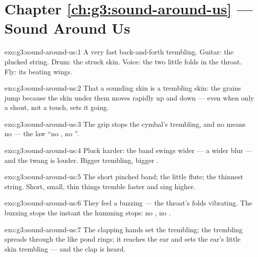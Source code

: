 \section*{Chapter \ref{ch:g3:sound-around-us} --- Sound Around Us}

\begin{solution}{exo:g3:sound-around-us:1}
A very fast back-and-forth trembling. Guitar: the plucked string.
Drum: the struck skin. Voice: the two little folds in the throat.
Fly: its beating wings.
\end{solution}

\begin{solution}{exo:g3:sound-around-us:2}
That a sounding skin is a trembling skin: the grains jump because
the skin under them moves rapidly up and down --- even when only a
shout, not a touch, sets it going.
\end{solution}

\begin{solution}{exo:g3:sound-around-us:3}
The grip stops the cymbal's trembling, and no  means no
 --- the law ``no , no ''.
\end{solution}

\begin{solution}{exo:g3:sound-around-us:4}
Pluck harder: the band swings wider --- a wider blur --- and the
twang is louder. Bigger trembling, bigger .
\end{solution}

\begin{solution}{exo:g3:sound-around-us:5}
The short pinched band; the little flute; the thinnest string.
Short, small, thin things tremble faster and sing higher.
\end{solution}

\begin{solution}{exo:g3:sound-around-us:6}
They feel a buzzing --- the throat's folds vibrating. The buzzing
stops the instant the humming stops: no , no .
\end{solution}

\begin{solution}{exo:g3:sound-around-us:7}
The clapping hands set the  trembling; the trembling spreads
through the  like pond rings; it reaches the ear and sets the
ear's little skin trembling --- and the clap is heard.
\end{solution}

